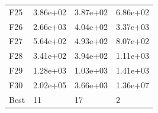 \begin{table}[H]
\begin{minipage}{.5\linewidth}
\begin{tabular}{llll}
            F25  &  3.86e+02 &  3.87e+02 &  6.86e+02 \\
            F26  &  2.66e+03 &  4.04e+02 &  3.37e+03 \\
            F27  &  5.64e+02 &  4.93e+02 &  8.07e+02 \\
            F28  &  3.41e+02 &  3.94e+02 &  1.11e+03 \\
            F29  &  1.28e+03 &  1.03e+03 &  1.41e+03 \\
            F30  &  2.02e+05 &  3.66e+03 &  1.36e+07 \\
            Best &        11 &        17 &         2 \\
            \bottomrule
            \end{tabular}
            
    \end{minipage} 
\end{table}

